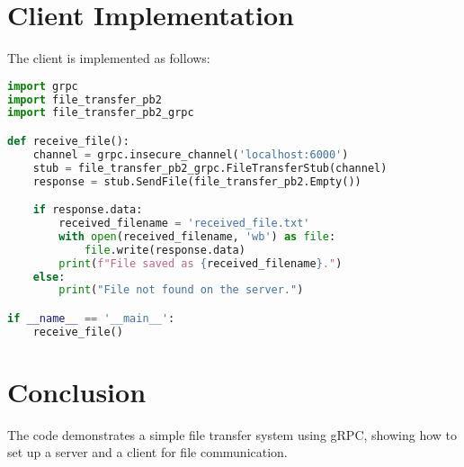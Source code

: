 \documentclass{article}
\begin{document}
\section{Client Implementation}
The client is implemented as follows:

\begin{lstlisting}[language=Python, caption=Client Code]
import grpc
import file_transfer_pb2
import file_transfer_pb2_grpc

def receive_file():
    channel = grpc.insecure_channel('localhost:6000')
    stub = file_transfer_pb2_grpc.FileTransferStub(channel)
    response = stub.SendFile(file_transfer_pb2.Empty())

    if response.data:
        received_filename = 'received_file.txt'
        with open(received_filename, 'wb') as file:
            file.write(response.data)
        print(f"File saved as {received_filename}.")
    else:
        print("File not found on the server.")

if __name__ == '__main__':
    receive_file()
\end{lstlisting}

\section{Conclusion}
The code demonstrates a simple file transfer system using gRPC, showing how to set up a server and a client for file communication. 
\end{document}
